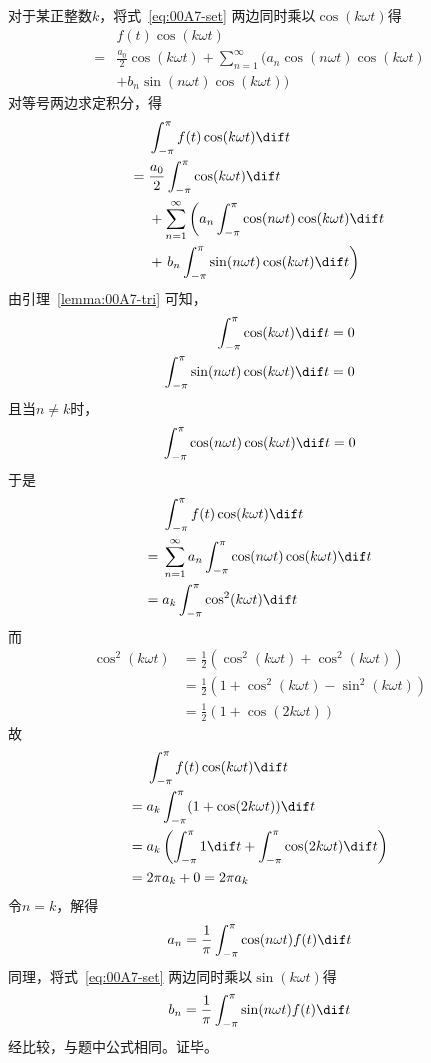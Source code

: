 对于某正整数$k$，将式~\ref{eq:00A7-set} 两边同时乘以$\cos(k\omega t)$得
\begin{align*}
  & f(t)\cos(k\omega t) \\
  ={}& \frac{a_0}2\cos(k\omega t) + \sum_{n = 1}^\infty (a_n\cos(n\omega t)\cos(k\omega t) \\
  &+ b_n\sin(n\omega t)\cos(k\omega t))
\end{align*}
对等号两边求定积分，得
\begin{align*}
  & \int_{-\pi}^\pi f(t)\cos(k\omega t) \dif t \\
  ={}& \frac{a_0}2\int_{-\pi}^\pi \cos(k\omega t) \dif t \\
  &+ \sum_{n = 1}^\infty \left(a_n\int_{-\pi}^\pi \cos(n\omega t)\cos(k\omega t) \dif t\right. \\
  &+ \left.b_n\int_{-\pi}^\pi \sin(n\omega t)\cos(k\omega t) \dif t\right)
\end{align*}
由引理~\ref{lemma:00A7-tri} 可知，
\begin{align*}
  \int_{-\pi}^\pi \cos(k\omega t) \dif t &= 0 \\
  \int_{-\pi}^\pi \sin(n\omega t)\cos(k\omega t) \dif t &= 0
\end{align*}
且当$n \ne k$时，
\[ \int_{-\pi}^\pi \cos(n\omega t)\cos(k\omega t) \dif t = 0 \]
于是
\begin{align*}
  & \int_{-\pi}^\pi f(t)\cos(k\omega t) \dif t \\
  ={}& \sum_{n = 1}^\infty a_n\int_{-\pi}^\pi \cos(n\omega t)\cos(k\omega t) \dif t \\
  ={}& a_k\int_{-\pi}^\pi \cos^2(k\omega t) \dif t
\end{align*}
而
\begin{align*}
  \cos^2(k\omega t) &= \frac12\left(\cos^2(k\omega t) + \cos^2(k\omega t)\right) \\
  &= \frac12\left(1 + \cos^2(k\omega t) - \sin^2(k\omega t)\right) \\
  &= \frac12\left(1 + \cos(2k\omega t)\right)
\end{align*}
故
\begin{align*}
  & \int_{-\pi}^\pi f(t)\cos(k\omega t) \dif t \\
  ={}& a_k\int_{-\pi}^\pi (1 + \cos(2k\omega t)) \dif t \\
  ={}& a_k\left(\int_{-\pi}^\pi 1 \dif t + \int_{-\pi}^\pi \cos(2k\omega t) \dif t\right) \\
  ={}& 2\pi a_k + 0 = 2\pi a_k \\
\end{align*}
令$n = k$，解得
\[ a_n = \frac1\pi \int_{-\pi}^\pi \cos(n\omega t)f(t) \dif t \]
同理，将式~\ref{eq:00A7-set} 两边同时乘以$\sin(k\omega t)$得
\[ b_n = \frac1\pi \int_{-\pi}^\pi \sin(n\omega t)f(t) \dif t \]
经比较，与题中公式相同。证毕。
